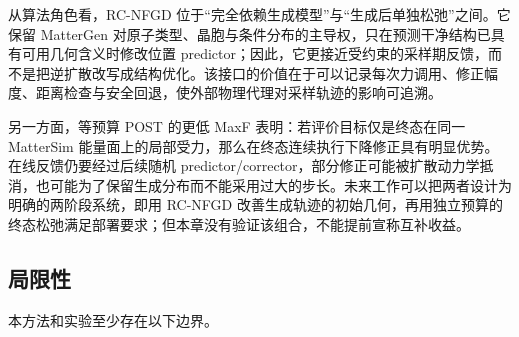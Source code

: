 从算法角色看，RC-NFGD 位于``完全依赖生成模型''与``生成后单独松弛''之间。它保留 MatterGen 对原子类型、晶胞与条件分布的主导权，只在预测干净结构已具有可用几何含义时修改位置 predictor；因此，它更接近受约束的采样期反馈，而不是把逆扩散改写成结构优化。该接口的价值在于可以记录每次力调用、修正幅度、距离检查与安全回退，使外部物理代理对采样轨迹的影响可追溯。

另一方面，等预算 POST 的更低 MaxF 表明：若评价目标仅是终态在同一 Matter\allowbreak Sim 能量面上的局部受力，那么在终态连续执行下降修正具有明显优势。在线反馈仍要经过后续随机 predictor/corrector，部分修正可能被扩散动力学抵消，也可能为了保留生成分布而不能采用过大的步长。未来工作可以把两者设计为明确的两阶段系统，即用 RC-NFGD 改善生成轨迹的初始几何，再用独立预算的终态松弛满足部署要求；但本章没有验证该组合，不能提前宣称互补收益。

\subsection{局限性}

本方法和实验至少存在以下边界。


